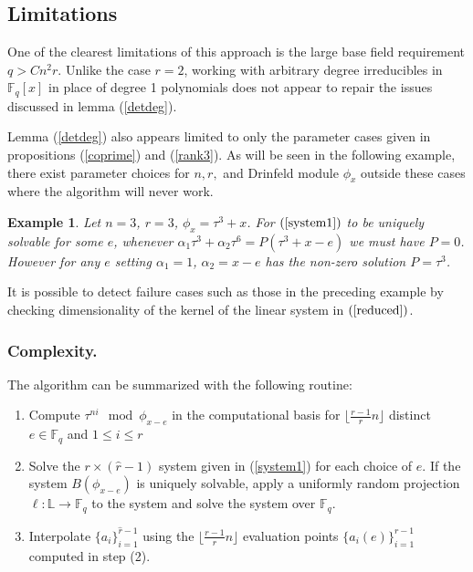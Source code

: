 \documentclass[sigconf]{acmart}
\newtheorem{example}{Example}
\newcommand{\F}{\mathbb{F}}
\renewcommand{\L}{\mathbb{L}}
\newcommand{\hatr}{\hat{r}}
\begin{document}
\subsection{Limitations}

One of the clearest limitations of this approach is the large base field requirement $q > Cn^2 r$. Unlike the case $r = 2$, working with arbitrary degree irreducibles in $\F_q[x]$ in place of degree 1 polynomials does not appear to repair the issues discussed in lemma (\ref{detdeg}).

Lemma (\ref{detdeg}) also appears limited to only the parameter cases given in propositions (\ref{coprime}) and (\ref{rank3}). As will be seen in the following example, there exist parameter choices for $n, r,$ and Drinfeld module $\phi_x$ outside these cases where the algorithm will never work.

\begin{example}\label{examplefail}
Let $n = 3$, $r =3$, $\phi_x = \tau^3 + x$. For $(\ref{system1})$ to be uniquely solvable for some $e$, whenever $\alpha_1 \tau^3 + \alpha_2 \tau^6 = P (\tau^3 + x - e)$ we must have $P = 0$. However for any $e$ setting $\alpha_1 = 1$, $\alpha_2 = x - e $ has the non-zero solution $P = \tau^3$.  
\end{example}

It is possible to detect failure cases such as those in the preceding example by checking dimensionality of the kernel of the linear system in $(\ref{reduced})$.  



\subsubsection{Complexity.}

The algorithm can be summarized with the following routine:

\begin{enumerate}
    \item Compute $\tau^{ni} \mod \phi_{x-e}$ in the computational basis for $\lfloor\frac{r-1}{r}n \rfloor$ distinct $e \in \F_q$ and $1 \leq i \leq r$
    \item Solve the $r \times (\hatr-1)$ system given in (\ref{system1}) for each choice of $e$. If the system $B(\phi_{x-e})$ is uniquely solvable, apply a uniformly random projection $\ell : \L \to \F_q$ to the system and solve the system over $\F_q$.
    \item Interpolate $\{a_i\}_{i=1}^{\hatr-1}$ using the $\lfloor\frac{r-1}{r}n \rfloor$ evaluation points $\{a_i(e)\}_{i=1}^{r-1}$ computed in step (2). 
\end{enumerate}
\end{document}
